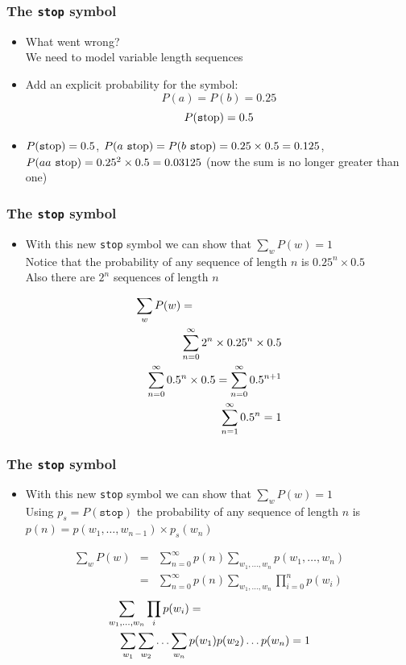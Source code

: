 \begin{frame}
\frametitle{The {\tt stop} symbol}
\begin{itemize}[<+->]
\item What went wrong? \\
We need to model variable length sequences
\item Add an explicit probability for the \lmstop symbol: 
\[ P(a) = P(b) = 0.25  \]
\[ P(\mbox{\texttt stop}) = 0.5 \]
\item $P(\mbox{\texttt stop}) = 0.5$, $P(a\ \mbox{\texttt stop}) = P(b\ \mbox{\texttt stop}) = 0.25 \times 0.5 = 0.125$, 
$P(aa\ \mbox{\texttt stop}) = 0.25^2 \times 0.5 = 0.03125$ (now the sum is no longer greater than one)
\end{itemize}
\end{frame}

\begin{frame}
\frametitle{The {\tt stop} symbol}
\begin{itemize}[<+->]
\item With this new {\tt stop} symbol we can show that $\sum_w P(w) = 1$ \\
Notice that the probability of any sequence of length $n$ is $0.25^n \times 0.5$ \\
Also there are $2^n$ sequences of length $n$
\end{itemize}
\begin{eqnarray}
\lefteqn{\sum_w P(w) = } \nonumber \\
&& \sum_{n=0}^{\infty} 2^n \times 0.25^n \times 0.5 \nonumber \\
&& \sum_{n=0}^{\infty} 0.5^n \times 0.5 = \sum_{n=0}^{\infty} 0.5^{n+1} \nonumber \\
&& \sum_{n=1}^{\infty} 0.5^n = 1 \nonumber
\end{eqnarray}
\end{frame}

\begin{frame}
\frametitle{The {\tt stop} symbol}
\begin{itemize}[<+->]
\item With this new {\tt stop} symbol we can show that $\sum_w P(w) = 1$ \\
Using $p_s = P(\texttt{stop})$ the probability of any sequence of length $n$ is $p(n) = p(w_1, \ldots, w_{n-1}) \times p_s(w_n)$ \\
\end{itemize}
\begin{eqnarray*}
\sum_w P(w) &=& \sum_{n=0}^{\infty} p(n) \sum_{w_1, \ldots, w_n} p(w_1, \ldots, w_n) \\
&=& \sum_{n=0}^{\infty} p(n) \sum_{w_1, \ldots, w_n} \prod_{i=0}^n p(w_i)
\end{eqnarray*}
\begin{eqnarray*}
\lefteqn{\sum_{w_1, \ldots, w_n} \prod_i p(w_i) = } \\
&& \sum_{w_1} \sum_{w_2} \ldots \sum_{w_n} p(w_1) p(w_2) \ldots p(w_n) = 1
\end{eqnarray*}
\end{frame}

